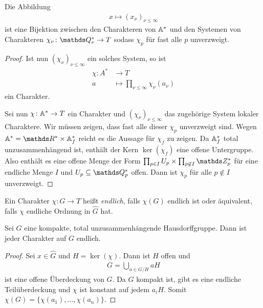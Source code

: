 \begin{prop}
Die Abbildung
\begin{align*}
x \mapsto (x_\nu)_{\nu \leq \infty}
\end{align*}
ist eine Bijektion zwischen den Charakteren von $\mathbb{A}^\ast$ und den Systemen von Charakteren $\chi_\nu \colon \Q_\nu^\ast \to T$ sodass $\chi_p$ für fast alle $p$ unverzweigt.
\end{prop}
\begin{proof}
Ist nun $(\chi_\nu)_{\nu \leq \infty}$ ein solches System, so ist
\begin{align*}
\chi \colon A^\ast &\to T\\
a&\mapsto \prod_{\nu \leq \infty} \chi_\nu(a_\nu)
\end{align*}
ein Charakter.

Sei nun $\chi \colon \mathbb{A}^\ast \to T$ ein Charakter und $(\chi_\nu)_{\nu \leq \infty}$ das zugehörige System lokaler Charaktere.
Wir müssen zeigen, dass fast alle dieser $\chi_p$ unverzweigt sind.
Wegen $\A^\ast=\R^\ast\times\A_f^\ast$ reicht es die Aussage für $\chi_f$ zu zeigen.
Da $\mathbb{A}_f^\ast$ total unzusammenhängend ist, enthält der Kern $\ker(\chi_f)$ eine offene Untergruppe.
Also enthält es eine offene Menge der Form
$\prod_{p \in I} U_p \times \prod_{p \not \in I} \Z_p^\ast$ für eine endliche Menge $I$ und $U_p \subseteq \Q_p^\ast$ offen.
Dann ist $\chi_p$ für alle $p \not  \in I$ unverzweigt.
\end{proof}

\begin{defi}
Ein Charakter $\chi \colon G \to T$ heißt \emph{endlich}, falls $\chi(G)$ endlich ist oder äquivalent, falls $\chi$ endliche Ordnung in $\hat{G}$ hat.
\end{defi}

\begin{prop}
Sei $G$ eine kompakte, total unzusammenhängende Hausdorffgruppe.
Dann ist jeder Charakter auf $G$ endlich.
\end{prop}
\begin{proof}
Sei $x \in \hat{G}$ und $H=\ker(\chi)$.
Dann ist $H$ offen und
\begin{align*}
G=\bigcup_{a \in G/H} aH
\end{align*}
ist eine offene Überdeckung von $G$.
Da $G$ kompakt ist, gibt es eine endliche Teilüberdeckung und $\chi$ ist konstant auf jedem $a_i H$. Somit $\chi(G)=\{\chi(a_1),\dots,\chi(a_n)\}$.
\end{proof}


